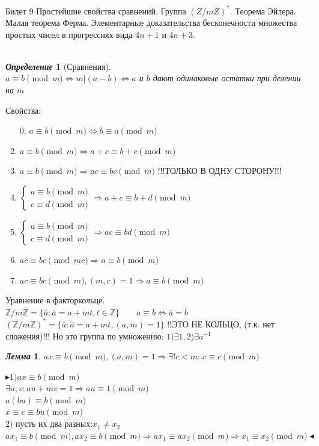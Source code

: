 \documentclass[a4paper,12pt]{article}
\newtheorem{deff}{\textit{Определение}}
\newtheorem{lem}{\textit{Лемма}}
\newcommand{\ee}{\equiv}
\newcommand{\q}{\quad}
\newcommand{\pb}{\blacktriangleright}
\newcommand{\pe}{\blacktriangleleft}
\newcommand{\Ra}{\Rightarrow}
\newcommand{\bb}[1]{\mathbb{#1}}
\newcommand{\os}{\left(}
\newcommand{\cs}{\right)}
\begin{document}
\newpage
\begin{mybox}{\hypertarget{bil9}{Билет 9}}
Простейшие свойства сравнений. Группа $\os Z/mZ \cs ^*$. Теорема Эйлера. Малая теорема Ферма. Элементарные доказательства бесконечности множества простых чисел в прогрессиях вида $4n+1$ и $4n+3$.\\\q\\
\begin{deff}[Сравнения]\q\\
$a \ee b \pmod{m}\iff m|(a-b) \iff a$ и $b$ дают одинаковые остатки при делении на $m$
\end{deff}
Свойства:
\begin{enumerate}
\item[0.] $a \ee b \pmod{m}\iff b \ee a \pmod{m}$
\item $a \ee b \pmod{m}\iff a + c \ee b + c\pmod{m}$
\item $a \ee b \pmod{m}\Ra ac \ee bc \pmod{m}$ !!!ТОЛЬКО В ОДНУ СТОРОНУ!!!
\item $\begin{cases} a \ee b \pmod{m}\\ c\ee d\pmod{m}\end{cases} \Ra a+c\ee b + d\pmod{m}$
\item $\begin{cases} a \ee b \pmod{m}\\ c\ee d\pmod{m}\end{cases} \Ra ac\ee bd\pmod{m}$
\item $ac\ee bc\pmod{mc}\Ra a\ee b\pmod{m}$
\item $ac\ee bc\pmod{m}, (m,c) = 1\Ra a\ee b\pmod{m}$
\end{enumerate}
Уравнение в факторкольце.\\
$\bb{Z}/m\bb{Z} = \{\bar{a}: \bar{a} = a + mt, t\in\bb{Z}\} \q\q a\ee b \iff \bar{a} = \bar{b}$\\
$\os \bb{Z}/m\bb{Z}  \cs^* = \{\bar{a}: \bar{a} = a + mt, (a,m) = 1\}$ !!ЭТО НЕ КОЛЬЦО, (т.к. нет сложения)!!! Но это группа по умножению: $1) \exists 1, 2) \exists a^{-1}$
\begin{lem} $ax\ee b\pmod{m}, (a,m) = 1\Ra \exists!c<m:x\ee c\pmod{m}$
\end{lem}
$\pb 1) ax\ee b\pmod{m} $\\
$\exists u,v: au+mv = 1\Ra au \ee 1 \pmod{m} $\\
$a(bu) \ee b\pmod{m}$\\
$x\ee c\ee bu\pmod{m}$\\
$2)$ пусть их два разных:$x_1\not= x_2$\\
$ax_1\ee b\pmod{m}, ax_2\ee b\pmod{m}\Ra ax_1 \ee ax_2\pmod{m}\Ra x_1\ee x_2\pmod{m}\pe$


\end{mybox}
\end{document}
